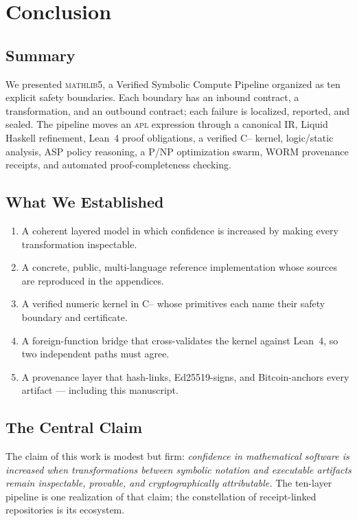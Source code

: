 \chapter{Conclusion}
\label{ch:conclusion}

\section{Summary}
\label{sec:con-summary}

We presented \textsc{mathlib5}, a Verified Symbolic Compute Pipeline organized
as ten explicit safety boundaries. Each boundary has an inbound contract, a
transformation, and an outbound contract; each failure is localized,
reported, and sealed. The pipeline moves an \textsc{apl} expression through a
canonical IR, Liquid Haskell refinement, Lean~4 proof obligations, a verified
C{--} kernel, logic/static analysis, ASP policy reasoning, a P/NP optimization
swarm, WORM provenance receipts, and automated proof-completeness checking.

\section{What We Established}
\label{sec:con-established}

\begin{enumerate}
  \item A coherent layered model in which confidence is increased by making
        every transformation inspectable.
  \item A concrete, public, multi-language reference implementation whose
        sources are reproduced in the appendices.
  \item A verified numeric kernel in C{--} whose primitives each name their
        safety boundary and certificate.
  \item A foreign-function bridge that cross-validates the kernel against
        Lean~4, so two independent paths must agree.
  \item A provenance layer that hash-links, Ed25519-signs, and Bitcoin-anchors
        every artifact --- including this manuscript.
\end{enumerate}

\section{The Central Claim}
\label{sec:con-claim}

The claim of this work is modest but firm: \emph{confidence in mathematical
software is increased when transformations between symbolic notation and
executable artifacts remain inspectable, provable, and cryptographically
attributable.} The ten-layer pipeline is one realization of that claim; the
constellation of receipt-linked repositories is its ecosystem.

